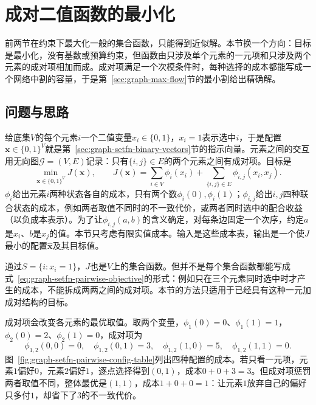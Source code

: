 
\section{成对二值函数的最小化}
\label{sec:graph-pairwise-binary-cut}

前两节在约束下最大化一般的集合函数，只能得到近似解。本节换一个方向：目标是最小化，没有基数或预算约束，但函数由只涉及单个元素的一元项和只涉及两个元素的成对项相加而成。成对项满足一个次模条件时，每种选择的成本都能写成一个网络中割的容量，于是第~\ref{sec:graph-max-flow}节的最小割给出精确解。

\subsection{问题与思路}
\label{sec:graph-setfn-pairwise-problem}

给底集$V$的每个元素$i$一个二值变量$x_i\in\{0,1\}$，$x_i=1$表示选中$i$，于是配置$\bm x\in\{0,1\}^V$就是第~\ref{sec:graph-setfn-binary-vectors}节的指示向量。元素之间的交互用无向图$\mathcal G=(V,E)$记录：只有$\{i,j\}\in E$的两个元素之间有成对项。目标是
\begin{equation}
  \min_{\bm x\in\{0,1\}^V}J(\bm x),\qquad
  J(\bm x)=\sum_{i\in V}\phi_i(x_i)+\sum_{\{i,j\}\in E}\phi_{i,j}(x_i,x_j).
  \label{eq:graph-setfn-pairwise-objective}
\end{equation}
$\phi_i$给出元素$i$两种状态各自的成本，只有两个数$\phi_i(0),\phi_i(1)$；$\phi_{i,j}$给出$i,j$四种联合状态的成本，例如两者取值不同时的不一致代价，或两者同时选中的配合收益（以负成本表示）。为了让$\phi_{i,j}(a,b)$的含义确定，对每条边固定一个次序，约定$a$是$x_i$、$b$是$x_j$的值。本节只考虑有限实值成本。输入是这些成本表，输出是一个使$J$最小的配置$\hat{\bm x}$及其目标值。

通过$S=\{i:x_i=1\}$，$J$也是$V$上的集合函数。但并不是每个集合函数都能写成式~\eqref{eq:graph-setfn-pairwise-objective}的形式：例如只在三个元素同时选中时才产生的成本，不能拆成两两之间的成对项。本节的方法只适用于已经具有这种一元加成对结构的目标。

成对项会改变各元素的最优取值。取两个变量，$\phi_1(0)=0$、$\phi_1(1)=1$，$\phi_2(0)=2$、$\phi_2(1)=0$，成对项为
\[
  \phi_{1,2}(0,0)=0,\quad\phi_{1,2}(0,1)=3,\quad\phi_{1,2}(1,0)=5,\quad\phi_{1,2}(1,1)=0.
\]
图~\ref{fig:graph-setfn-pairwise-config-table}列出四种配置的成本。若只看一元项，元素$1$偏好$0$，元素$2$偏好$1$，逐点选择得到$(0,1)$，成本$0+0+3=3$。但成对项惩罚两者取值不同，整体最优是$(1,1)$，成本$1+0+0=1$：让元素$1$放弃自己的偏好只多付$1$，却省下了$3$的不一致代价。

